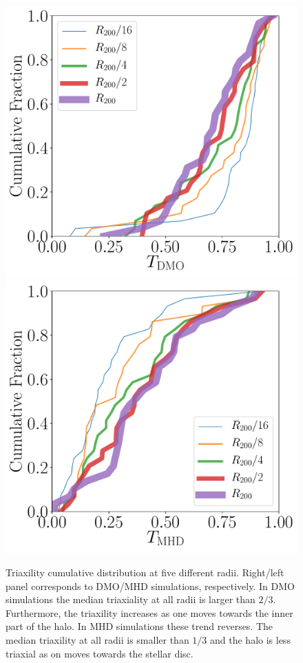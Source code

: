 \documentclass[usenatbib]{mnras}
\begin{document}
\begin{figure}
\includegraphics[width=0.8\columnwidth]{triaxialiy_distro_DM.pdf}
\includegraphics[width=0.8\columnwidth]{triaxialiy_distro_MHD.pdf}
\caption{Triaxility cumulative distribution at five different radii.
  Right/left panel corresponds to DMO/MHD simulations, respectively. 
  In DMO simulations the median triaxiality at all radii is larger
  than $2/3$. Furthermore, the triaxility increases as one moves
  towards the inner part of the halo.
  In MHD simulations these trend reverses.
  The median triaxility at all radii is smaller than $1/3$ and the
  halo is less triaxial as on moves towards the stellar disc.}
\label{fig:triaxial_cumulative}
\end{figure}
\end{document}
